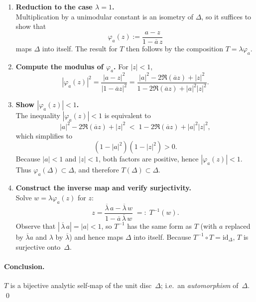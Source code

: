 \documentclass[12pt]{article}
\theoremstyle{definition} %
\theoremstyle{plain} %
\begin{document}
\begin{enumerate}
\item \textbf{Reduction to the case $\lambda=1$.}  \\
      Multiplication by a unimodular constant is an isometry of
      $\Delta$, so it suffices to show that
      \[
          \varphi_{a}(z):=\frac{a-z}{1-\overline{a}\,z}
      \]
      maps $\Delta$ into itself.  The result for $T$ then follows by the
      composition $T=\lambda\varphi_{a}$.

\item \textbf{Compute the modulus of $\varphi_{a}$.}  For $|z|<1$,
      \[
          |\varphi_{a}(z)|^{2}
          =\frac{|a-z|^{2}}{|1-\overline{a}z|^{2}}
          =\frac{|a|^{2}-2\Re(\overline{a}z)+|z|^{2}}
                 {1-2\Re(\overline{a}z)+|a|^{2}|z|^{2}}.
      \]

\item \textbf{Show $|\varphi_{a}(z)|<1$.}\\
      The inequality $|\varphi_{a}(z)|<1$ is equivalent to
      \[
         |a|^{2}-2\Re(\overline{a}z)+|z|^{2}
         \;<\;
         1-2\Re(\overline{a}z)+|a|^{2}|z|^{2},
      \]
      which simplifies to
      \[
         (1-|a|^{2})(1-|z|^{2})>0.
      \]
      Because $|a|<1$ and $|z|<1$, both factors are positive, hence
      $|\varphi_{a}(z)|<1$.  Thus $\varphi_{a}(\Delta)\subset \Delta$,
      and therefore $T(\Delta)\subset\Delta$.

\item \textbf{Construct the inverse map and verify surjectivity.}\\
      Solve $w=\lambda\varphi_{a}(z)$ for $z$:
      \[
          z
          =\frac{\overline{\lambda}\,a-\overline{\lambda}\,w}
                 {1-\overline{a}\,\overline{\lambda}\,w}
          \;=:\;T^{-1}(w).
      \]
      Observe that $|\,\overline{\lambda}\,a|=|a|<1$, so $T^{-1}$ has the
      same form as $T$ (with $a$ replaced by $\overline{\lambda}a$ and
      $\lambda$ by $\overline{\lambda}$) and hence maps $\Delta$
      into itself.  Because $T^{-1}\circ T=\mathrm{id}_{\Delta}$,  
      $T$ is surjective onto~$\Delta$.

\end{enumerate}

\paragraph{Conclusion.}  
$T$ is a bijective analytic self‑map of the unit disc~$\Delta$; i.e.\ an
\emph{automorphism} of~$\Delta$. \qed
\end{document}
